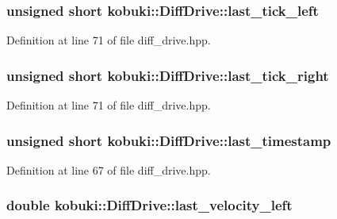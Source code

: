\subsubsection[{last\-\_\-tick\-\_\-left}]{\setlength{\rightskip}{0pt plus 5cm}unsigned short {\bf kobuki\-::\-Diff\-Drive\-::last\-\_\-tick\-\_\-left}\hspace{0.3cm}{\ttfamily  [private]}}\label{classkobuki_1_1DiffDrive_aae2baf5652d3cf5d17b9430df74460bc}


\-Definition at line 71 of file diff\-\_\-drive.\-hpp.

\subsubsection[{last\-\_\-tick\-\_\-right}]{\setlength{\rightskip}{0pt plus 5cm}unsigned short {\bf kobuki\-::\-Diff\-Drive\-::last\-\_\-tick\-\_\-right}\hspace{0.3cm}{\ttfamily  [private]}}\label{classkobuki_1_1DiffDrive_a5486e5f69560bf760c44893babcc03a4}


\-Definition at line 71 of file diff\-\_\-drive.\-hpp.

\subsubsection[{last\-\_\-timestamp}]{\setlength{\rightskip}{0pt plus 5cm}unsigned short {\bf kobuki\-::\-Diff\-Drive\-::last\-\_\-timestamp}\hspace{0.3cm}{\ttfamily  [private]}}\label{classkobuki_1_1DiffDrive_a8dc0a500edd3524833540839b1d145a6}


\-Definition at line 67 of file diff\-\_\-drive.\-hpp.

\subsubsection[{last\-\_\-velocity\-\_\-left}]{\setlength{\rightskip}{0pt plus 5cm}double {\bf kobuki\-::\-Diff\-Drive\-::last\-\_\-velocity\-\_\-left}\hspace{0.3cm}{\ttfamily  [private]}}\label{classkobuki_1_1DiffDrive_a48835379938377e577583e5cd70b97ce}


